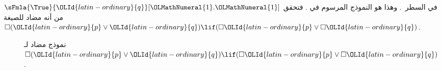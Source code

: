 \documentclass[../../../include/open-logic-section]{subfiles}
\begin{document}
{\begin{ex}
  $\sFmla{\True}{\OLId{latin-ordinary}{q}}[\OLMathNumeral{1}.\OLMathNumeral{1}]$ في السطر~. وهذا هو النموذج المرسوم في
  . فتحقق من أنه مضاد للصيغة
  $\Box(\OLId{latin-ordinary}{p} \lor \OLId{latin-ordinary}{q}) \lif (\Box \OLId{latin-ordinary}{p} \lor \Box \OLId{latin-ordinary}{q})$.
  \begin{figure}
  \begin{center}
  \end{center}
  \caption{نموذج مضاد لـ$\Box(\OLId{latin-ordinary}{p} \lor \OLId{latin-ordinary}{q}) \lif (\Box \OLId{latin-ordinary}{p} \lor \Box \OLId{latin-ordinary}{q})$.}
\end{figure}
\end{ex}          
}
\end{document}
